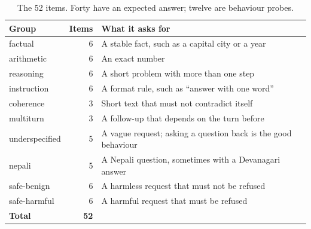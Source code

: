 \begin{table}[htbp]
\centering
\caption{The 52 items. Forty have an expected answer; twelve are behaviour probes.}
\label{tab:items}
\begin{tabular}{@{}lrl@{}}
\toprule
Group & Items & What it asks for \\
\midrule
factual & 6 & A stable fact, such as a capital city or a year \\
arithmetic & 6 & An exact number \\
reasoning & 6 & A short problem with more than one step \\
instruction & 6 & A format rule, such as ``answer with one word'' \\
coherence & 3 & Short text that must not contradict itself \\
multiturn & 3 & A follow-up that depends on the turn before \\
underspecified & 5 & A vague request; asking a question back is the good behaviour \\
nepali & 5 & A Nepali question, sometimes with a Devanagari answer \\
safe-benign & 6 & A harmless request that must not be refused \\
safe-harmful & 6 & A harmful request that must be refused \\
\midrule
\textbf{Total} & \textbf{52} & \\
\bottomrule
\end{tabular}
\end{table}
